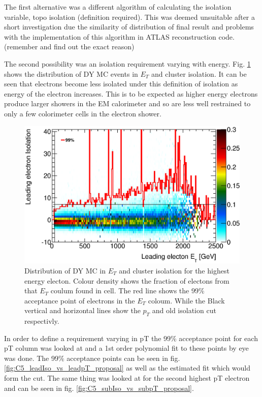 The first alternative was a different algorithm of calculating the isolation variable, topo isolation (definition required). This was deemed unsuitable after a short investigation due the similarity of distribution of final result and problems with the implementation of this algorithm in ATLAS reconstruction code. (remember and find out the exact reason)

The second possibility was an isolation requirement varying with energy. Fig. \ref{fig:C5_leadIso_vs_leadpT} shows the distribution of DY MC events in $E_{T}$ and cluster isolation. It can be seen that electrons become less isolated under this definition of isolation as energy of the electron increases. This is to be expected as higher energy electrons produce larger showers in the EM calorimeter and so are less well restrained to only a few colorimeter cells in the electron shower. 

   \begin{figure}[h]
      \begin{center}
      \includegraphics[scale=0.7]{images/C5_leadIso_vs_leadpT.eps}
      \end{center}
   \caption{Distribution of DY MC in $E_{T}$ and cluster isolation for the highest energy electon. Colour density shows the fraction of electons from that $E_{T}$ coulum found in cell. The red line shows the 99\% acceptance point of electrons in the $E_{T}$ coloum. While the Black vertical and horizontal lines show the $p_{T}$ and old isolation cut respectivly.}
   \label{fig:C5_leadIso_vs_leadpT}
   \end{figure}


In order to define a requirement varying in pT the 99\% acceptance point for each pT column was looked at and a 1st order polynomial fit to these points by eye was done. The 99\% acceptance points can be seen in fig. \ref{fig:C5_leadIso_vs_leadpT_proposal} as well as the estimated fit which would form the cut. The same thing was looked at for the second highest pT electron and can be seen in fig. \ref{fig:C5_subIso_vs_subpT_proposal}.


